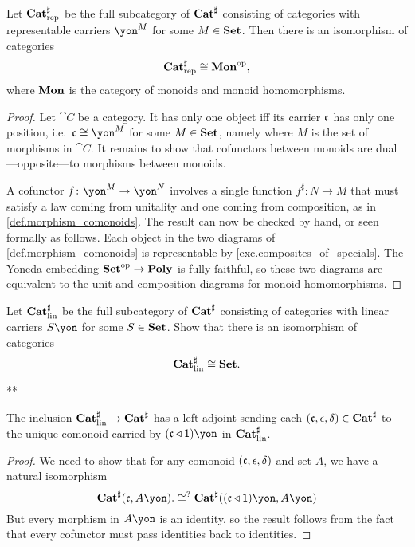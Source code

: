 \documentclass[Book-Poly]{subfiles}
\begin{document}
\begin{proposition}
Let $\mathbf{Cat}^\sharp_{\text{rep}}$ be the full subcategory of $\mathbf{Cat}^\sharp$ consisting of categories with representable carriers $\yon^M$ for some $M\in\mathbf{Set}$.
Then there is an isomorphism of categories
\[
    \mathbf{Cat}^\sharp_{\text{rep}}\cong\mathbf{Mon}^{\textnormal{op}},
\]
where $\mathbf{Mon}$ is the category of monoids and monoid homomorphisms.
\end{proposition}
\begin{proof}
Let $\cat{C}$ be a category. It has only one object iff its carrier $\mathfrak{c}$ has only one position, i.e.\ $\ema{c}\cong\yon^M$ for some $M\in\mathbf{Set}$, namely where $M$ is the set of morphisms in $\cat{C}$. It remains to show that cofunctors between monoids are dual---opposite---to morphisms between monoids.

A cofunctor $f\colon\yon^M\to\yon^N$ involves a single function $f^\sharp\colon N\to M$ that must satisfy a law coming from unitality and one coming from composition, as in \cref{def.morphism_comonoids}. The result can now be checked by hand, or seen formally as follows. Each object in the two diagrams of \eqref{def.morphism_comonoids} is representable by \cref{exc.composites_of_specials}. The Yoneda embedding $\mathbf{Set}^{\textnormal{op}}\to\mathbf{Poly}$ is fully faithful, so these two diagrams are equivalent to the unit and composition diagrams for monoid homomorphisms.
\end{proof}

\begin{exercise}\label{exc.lin_comon_set}
Let $\mathbf{Cat}^\sharp_{\text{lin}}$ be the full subcategory of $\mathbf{Cat}^\sharp$ consisting of categories with linear carriers $S\yon$ for some $S\in\mathbf{Set}$.
Show that there is an isomorphism of categories
\[
\mathbf{Cat}^\sharp_{\text{lin}}\cong\mathbf{Set}.
\qedhere
\]
\begin{solution}
**
\end{solution}
\end{exercise}

\begin{proposition}
The inclusion $\mathbf{Cat}^\sharp_{\text{lin}}\to\mathbf{Cat}^\sharp$ has a left adjoint sending each $(\mathfrak{c},\epsilon,\delta)\in\mathbf{Cat}^\sharp$ to the unique comonoid carried by $(\ema{c}\tri\1)\yon$ in $\mathbf{Cat}^\sharp_{\text{lin}}$.
\end{proposition}
\begin{proof}
We need to show that for any comonoid $(\mathfrak{c},\epsilon,\delta)$ and set $A$, we have a natural isomorphism
\[
  \smcat^\sharp(\ema{c},A\yon).
  \cong^?
  \smcat^\sharp((\ema{c}\tri\1)\yon,A\yon)
\]
But every morphism in $A\yon$ is an identity, so the result follows from the fact that every cofunctor must pass identities back to identities. 
\end{proof}
\end{document}
